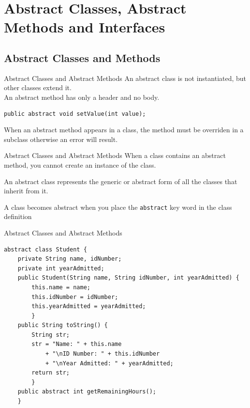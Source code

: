 \documentclass[11pt]{beamer}
\begin{document}
\section{Abstract Classes, Abstract Methods and Interfaces}
\subsection{Abstract Classes and Methods}
\begin{frame}[fragile]{Abstract Classes and Abstract Methods}
    An abstract class is not instantiated, but other classes extend it. \\ \vspace{1em}
    An abstract method has only a header and no body. \\ \vspace{1em}
    \begin{lstlisting}
public abstract void setValue(int value);
    \end{lstlisting}
    When an abstract method appears in a class, the method must be overriden in a subclass otherwise an error will result.
\end{frame}

\begin{frame}{Abstract Classes and Abstract Methods}
    When a class contains an abstract method, you cannot create an instance of the class. \\ \vspace{1em}

    An abstract class represents the generic or abstract form of all the classes that inherit from it. \\ \vspace{1em}

    A class becomes abstract when you place the \texttt{abstract} key word in the class definition
\end{frame}

\begin{frame}[fragile]{Abstract Classes and Abstract Methods}
    \begin{lstlisting}[basicstyle=\ttfamily\footnotesize]
abstract class Student {
    private String name, idNumber;
    private int yearAdmitted;
    public Student(String name, String idNumber, int yearAdmitted) {
        this.name = name;
        this.idNumber = idNumber;
        this.yearAdmitted = yearAdmitted;
        }
    public String toString() {
        String str;
        str = "Name: " + this.name
            + "\nID Number: " + this.idNumber
            + "\nYear Admitted: " + yearAdmitted;
        return str;
        }
    public abstract int getRemainingHours();
    }
    \end{lstlisting}    
\end{frame}
\end{document}
